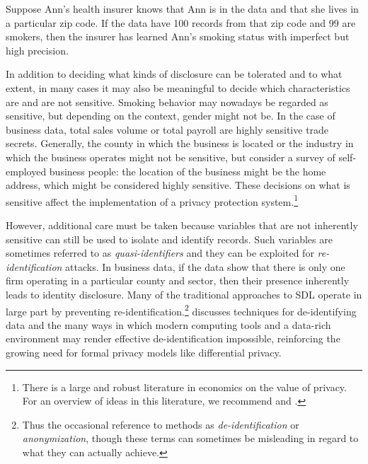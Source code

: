 \begin{bboxfix}
Suppose Ann's health insurer knows that Ann is in the data and that she
lives in a particular zip code. If the data have 100 records from that
zip code and 99 are smokers, then the insurer has learned Ann's smoking
status with imperfect but high precision.
\end{bboxfix}

In addition to deciding what kinds of disclosure can be tolerated and to what extent, in many cases it may also be meaningful to decide which characteristics are and are not sensitive. Smoking behavior may nowadays be regarded as sensitive, but depending on the context, gender might not be. In the case of business data, total sales volume or total payroll are highly sensitive trade secrets. Generally, the county in which the business is located or the industry in which the business operates might not be sensitive, but consider a survey of self-employed business people: the location of the business might be the home address, which might be considered highly sensitive. These decisions on what is sensitive affect the implementation of a privacy protection system.\footnote{There is a large and robust literature in economics on the value of privacy. For an overview of ideas in this literature, we recommend \citet{varian_economic_2002} and \citet{acquisti_economics_2016}.}

However, additional care must be taken because variables that are not inherently sensitive can still be used to isolate and identify records. Such variables are sometimes referred to as \emph{quasi-identifiers} and they can be exploited for \emph{re-identification} attacks. In business data, if the data show that there is only one firm operating in a particular county and sector, then their presence inherently leads to identity disclosure. Many of the traditional approaches to SDL operate in large part by preventing re-identification.\footnote{Thus the occasional reference to methods as \emph{de-identification} or \emph{anonymization}, though these terms can sometimes be misleading in regard to what they can actually achieve.} \citet{garfinkel_-identification_2015} discusses techniques for de-identifying data and the many ways in which modern computing tools and a data-rich environment may render effective de-identification impossible, reinforcing the growing need for formal privacy models like differential privacy.


